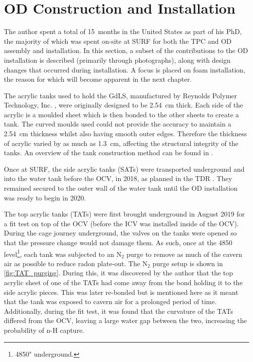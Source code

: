 \section{OD Construction and Installation} 
\label{sec:od_construction_sec}
\par
The author spent a total of 15~months in the United States as part of his PhD, the majority of which was spent on-site at SURF for both the TPC and OD assembly and installation.
In this section, a subset of the contributions to the OD installation is described (primarily through photographs), along with design changes that occurred during installation.
A focus is placed on foam installation, the reason for which will become apparent in the next chapter.

\par
The acrylic tanks used to hold the GdLS, manufactured by Reynolds Polymer Technology, Inc. \cite{reynolds_acrlyic_ref}, were originally designed to be 2.54~cm thick.
Each side of the acrylic is a moulded sheet which is then bonded to the other sheets to create a tank.
The curved moulds used could not provide the accuracy to maintain a 2.54~cm thickness whilst also having smooth outer edges.
Therefore the thickness of acrylic varied by as much as 1.3~cm, affecting the structural integrity of the tanks.
An overview of the tank construction method can be found in \cite{scotthaselschwardt_thesis_ref}.

\par
Once at SURF, the side acrylic tanks (SATs) were transported underground and into the water tank before the OCV, in 2018, as planned in the TDR \cite{LZ_TechnicalDesignReview_ref}.
They remained secured to the outer wall of the water tank until the OD installation was ready to begin in 2020. 

\par
The top acrylic tanks (TATs) were first brought underground in August 2019 for a fit test on top of the OCV (before the ICV was installed inside of the OCV).
During the cage journey underground, the valves on the tanks were opened so that the pressure change would not damage them.
As such, once at the 4850 level\footnote{4850" underground.}, each tank was subjected to an N$_2$ purge to remove as much of the cavern air as possible to reduce radon plate-out.
The N$_2$ purge setup is shown in \autoref{fig:TAT_purging}.
During this, it was discovered by the author that the top acrylic sheet of one of the TATs had come away from the bond holding it to the side acrylic pieces.
This was later re-bonded but is mentioned here as it meant that the tank was exposed to cavern air for a prolonged period of time.
Additionally, during the fit test, it was found that the curvature of the TATs differed from the OCV, leaving a large water gap between the two, increasing the probability of n-H capture.


